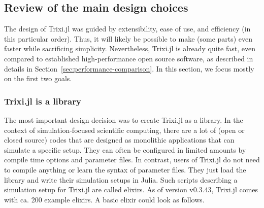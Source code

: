 \documentclass{juliacon}
\makeatletter
\newcommand{\ca}[0]{{ca.\@}\xspace}
\newcommand{\trixi}{Trixi.jl\xspace}
\makeatother
\begin{document}
\subsection{Review of the main design choices}

The design of \trixi was guided by extensibility, ease of use, and efficiency
(in this particular order). Thus, it will likely be possible to make (some parts)
even faster while sacrificing simplicity. Nevertheless, \trixi is already quite
fast, even compared to established high-performance open source software,
as described in details in Section~\ref{sec:performance-comparison}. In this
section, we focus mostly on the first two goals.

\subsubsection{\trixi is a library}

The most important design decision was to create \trixi as a library. In the
context of simulation-focused scientific computing, there are a lot of (open
or closed source) codes that are designed as monolithic applications that can
simulate a specific setup. They can often be configured in limited amounts by
compile time options and parameter files. In contrast, users of \trixi do not
need to compile anything or learn the syntax of parameter files. They just load
the library and write their simulation setups in Julia. Such scripts describing
a simulation setup for \trixi are called elixirs. As of version v0.3.43, \trixi
comes with \ca 200 example elixirs. A basic elixir could look as follows.
\end{document}
